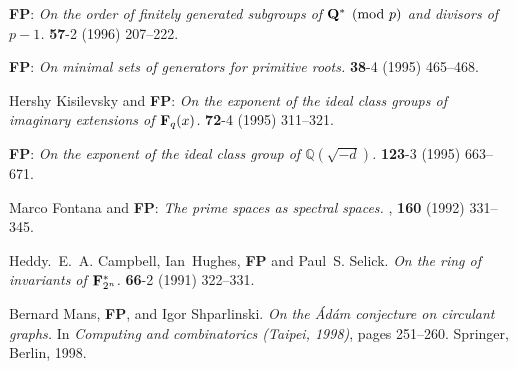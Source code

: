 \documentclass[12pt]{amsart}
\begin{document}
\begin{thebibliography}{10}
 \textbf{F\!P}: \textit{On the order of finitely
generated subgroups of ${\mathbf{Q}}\sp
 *\pmod p$ and divisors of $p-1$.} 
\textbf{57}-2 (1996) 207--222.\bigskip

 \textbf{F\!P}: \textit{On minimal sets of
generators for primitive roots.} 
\textbf{38}-4 (1995) 465--468.\bigskip

 Hershy Kisilevsky and \textbf{F\!P}: \textit{On
the exponent of the ideal class groups of imaginary extensions of
  $\mathbf {F}\sb q(x)$.}  \textbf{72}-4 (1995)
311--321.\bigskip

 \textbf{F\!P}: \textit{On the exponent of the
ideal class group of $\mathbb Q(\sqrt{-d})$.}  \textbf{123}-3 (1995) 663--671.\bigskip

 Marco Fontana and \textbf{F\!P}: \textit{The prime
spaces as spectral spaces.} ,
\textbf{160} (1992) 331--345.\bigskip

 Heddy.~E.~A. Campbell, Ian~Hughes, \textbf{F\!P} and
Paul~S. Selick. \textit{On the ring of invariants of ${\mathbf
{F}}\sp *\sb {2\sp n}$.}
\textbf{66}-2 (1991) 322--331.\bigskip

 Bernard Mans, \textbf{F\!P}, and Igor Shparlinski.
\textit{On the \'{A}d\'am conjecture on circulant graphs.} \newblock In
{\em Computing and combinatorics (Taipei, 1998)}, pages 251--260.
  Springer, Berlin, 1998.\bigskip
\end{thebibliography} 
\end{document}
